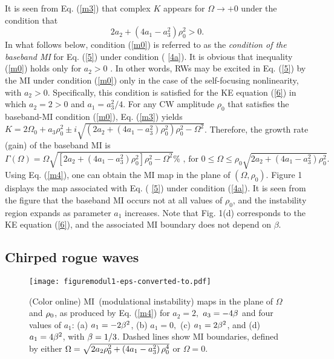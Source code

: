 \documentclass[preprintnumbers]{revtex4}
\begin{document}
It is seen from Eq. (\ref{m3}) that complex $K$ appears for $\Omega
\rightarrow +0$ under the condition that
\begin{equation}
\allowbreak 2a_{2}+\left( 4a_{1}-a_{3}^{2}\right) \rho _{0}^{2}>0.
\label{m0}
\end{equation}%
In what follows below, condition (\ref{m0})$\allowbreak $ is referred to as
the \textit{condition of the baseband MI} for Eq. (\ref{5}) under condition (%
\ref{4a}). It is obvious that inequality (\ref{m0}) holds only for $a_{2}>0$%
. In other words, RWs may be excited in Eq. (\ref{5}) by the MI under
condition (\ref{m0}) only in the case of the self-focusing nonlinearity,
with $a_{2}>0$. Specifically, this condition is satisfied for the KE
equation (\ref{6}) in which $a_{2}=2>0$ and $a_{1}=a_{3}^{2}/4$. For any CW
amplitude $\rho _{0}$ that satisfies the baseband-MI condition (\ref{m0}),
Eq. (\ref{m3}) yields $K=2\Omega _{0}+a_{3}\rho _{0}^{2}\pm i\sqrt{\left(
\allowbreak 2a_{2}+\left( 4a_{1}-a_{3}^{2}\right) \rho _{0}^{2}\right) \rho
_{0}^{2}-\Omega ^{2}}$. Therefore, the growth rate (gain) of the baseband MI
is
\begin{equation}
\Gamma (\Omega )=\Omega \sqrt{\left[ \allowbreak 2a_{2}+\left(
4a_{1}-a_{3}^{2}\right) \rho _{0}^{2}\right] \rho _{0}^{2}-\Omega ^{2}}\text{%
, for \ }0\leq \Omega \leq \rho _{0}\sqrt{2a_{2}+\left(
4a_{1}-a_{3}^{2}\right) \rho _{0}^{2}}.  \label{m4}
\end{equation}%
Using Eq. (\ref{m4}), one can obtain the MI map in the plane of $\left(
\Omega ,\rho _{0}\right) $. Figure 1 displays the map associated with Eq. (%
\ref{5}) under condition (\ref{4a}). It is seen from the figure that the
baseband MI occurs not at all values of $\rho _{0}$, and the instability
region expands as parameter $a_{1}$ increases. Note that Fig. 1(d)
corresponds to the KE equation (\ref{6}), and the associated MI boundary
does not depend on $\beta $.

\subsection{ Chirped rogue waves}

\begin{figure}[tbp]
\centerline{\texttt{[image: figuremodul1-eps-converted-to.pdf]}}
\caption{(Color online) MI\ (modulational instability) maps in the plane of $%
\Omega $ and $\protect\rho _{0}$, as produced by Eq. (\protect\ref{m4}) for $%
a_{2}=2,$ $a_{3}=-4\protect\beta $ and four values of $a_{1}$: (a) $a_{1}=-2%
\protect\beta ^{2}$, (b) $a_{1}=0,$ (c) $a_{1}=2\protect\beta ^{2}$, and (d)
$a_{1}=4\protect\beta ^{2}$, with $\protect\beta =1/3$. Dashed lines show MI
boundaries, defined by either $\Omega =\protect\sqrt{\allowbreak 2a_{2}%
\protect\rho _{0}^{2}+\left( 4a_{1}-a_{3}^{2}\right) \protect\rho _{0}^{4}}$
or $\Omega =0$.}
\label{fig1}
\end{figure}
\end{document}

